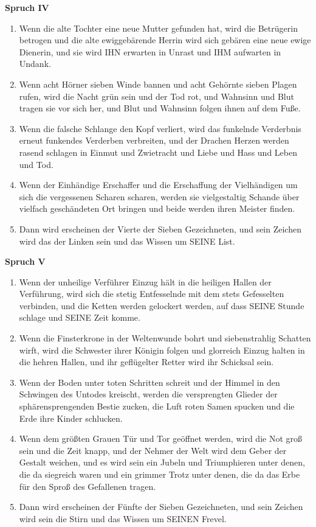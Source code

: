 \textbf{Spruch IV}

\begin{enumerate}
    \item Wenn die alte Tochter eine neue Mutter gefunden hat, wird die Betrügerin betrogen und die alte ewiggebärende Herrin wird sich gebären eine neue ewige Dienerin, und sie wird IHN erwarten in Unrast und IHM aufwarten in Undank.
    \item Wenn acht Hörner sieben Winde bannen und acht Gehörnte sieben Plagen rufen, wird die Nacht grün sein und der Tod rot, und Wahnsinn und Blut tragen sie vor sich her, und Blut und Wahnsinn folgen ihnen auf dem Fuße.
    \item Wenn die falsche Schlange den Kopf verliert, wird das funkelnde Verderbnis erneut funkendes Verderben verbreiten, und der Drachen Herzen werden rasend schlagen in Einmut und Zwietracht und Liebe und Hass und Leben und Tod.
    \item Wenn der Einhändige Erschaffer und die Erschaffung der Vielhändigen um sich die vergessenen Scharen scharen, werden sie vielgestaltig Schande über vielfach geschändeten Ort bringen und beide werden ihren Meister finden.
    \item Dann wird erscheinen der Vierte der Sieben Gezeichneten, und sein Zeichen wird das der Linken sein und das Wissen um SEINE List.
\end{enumerate}

\textbf{Spruch V}

\begin{enumerate}
    \item Wenn der unheilige Verführer Einzug hält in die heiligen Hallen der Verführung, wird sich die stetig Entfesselnde mit dem stets Gefesselten verbinden, und die Ketten werden gelockert werden, auf dass SEINE Stunde schlage und SEINE Zeit komme.
    \item Wenn die Finsterkrone in der Weltenwunde bohrt und siebenstrahlig Schatten wirft, wird die Schwester ihrer Königin folgen und glorreich Einzug halten in die hehren Hallen, und ihr geflügelter Retter wird ihr Schicksal sein.
    \item Wenn der Boden unter toten Schritten schreit und der Himmel in den Schwingen des Untodes kreischt, werden die versprengten Glieder der sphärensprengenden Bestie zucken, die Luft roten Samen spucken und die Erde ihre Kinder schlucken.
    \item Wenn dem größten Grauen Tür und Tor geöffnet werden, wird die Not groß sein und die Zeit knapp, und der Nehmer der Welt wird dem Geber der Gestalt weichen, und es wird sein ein Jubeln und Triumphieren unter denen, die da siegreich waren und ein grimmer Trotz unter denen, die da das Erbe für den Sproß des Gefallenen tragen.
    \item Dann wird erscheinen der Fünfte der Sieben Gezeichneten, und sein Zeichen wird sein die Stirn und das Wissen um SEINEN Frevel.
\end{enumerate}

